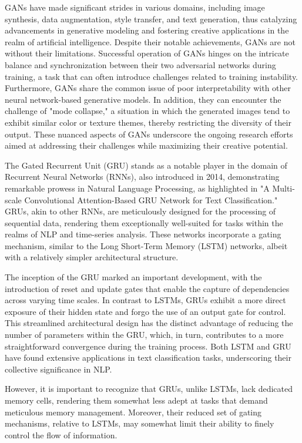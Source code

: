 \documentclass[conference]{IEEEtran}
\begin{document}
GANs have made significant strides in various domains, including image synthesis, data augmentation, style transfer, and text generation, thus catalyzing advancements in generative modeling and fostering creative applications in the realm of artificial intelligence. Despite their notable achievements, GANs are not without their limitations. Successful operation of GANs hinges on the intricate balance and synchronization between their two adversarial networks during training, a task that can often introduce challenges related to training instability. Furthermore, GANs share the common issue of poor interpretability with other neural network-based generative models. In addition, they can encounter the challenge of "mode collapse," a situation in which the generated images tend to exhibit similar color or texture themes, thereby restricting the diversity of their output. These nuanced aspects of GANs underscore the ongoing research efforts aimed at addressing their challenges while maximizing their creative potential.


The Gated Recurrent Unit (GRU) stands as a notable player in the domain of Recurrent Neural Networks (RNNs), also introduced in 2014, demonstrating remarkable prowess in Natural Language Processing, as highlighted in "A Multi-scale Convolutional Attention-Based GRU Network for Text Classification." GRUs, akin to other RNNs, are meticulously designed for the processing of sequential data, rendering them exceptionally well-suited for tasks within the realms of NLP and time-series analysis. These networks incorporate a gating mechanism, similar to the Long Short-Term Memory (LSTM) networks, albeit with a relatively simpler architectural structure.


The inception of the GRU marked an important development, with the introduction of reset and update gates that enable the capture of dependencies across varying time scales. In contrast to LSTMs, GRUs exhibit a more direct exposure of their hidden state and forgo the use of an output gate for control. This streamlined architectural design has the distinct advantage of reducing the number of parameters within the GRU, which, in turn, contributes to a more straightforward convergence during the training process. Both LSTM and GRU have found extensive applications in text classification tasks, underscoring their collective significance in NLP.


However, it is important to recognize that GRUs, unlike LSTMs, lack dedicated memory cells, rendering them somewhat less adept at tasks that demand meticulous memory management. Moreover, their reduced set of gating mechanisms, relative to LSTMs, may somewhat limit their ability to finely control the flow of information. 
\end{document}

